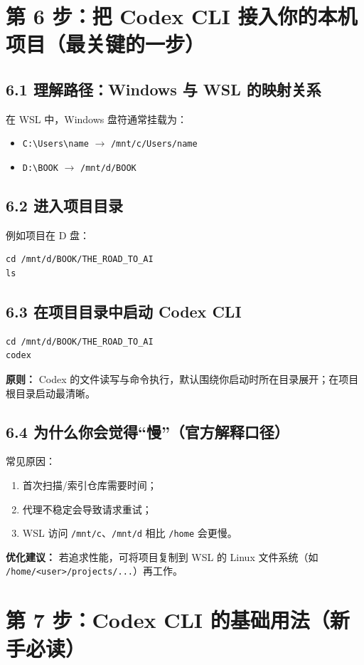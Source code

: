 \documentclass[11pt,a4paper]{article}
\begin{document}
\section{第 6 步：把 Codex CLI 接入你的本机项目（最关键的一步）}
\subsection{6.1 理解路径：Windows 与 WSL 的映射关系}
在 WSL 中，Windows 盘符通常挂载为：
\begin{itemize}[leftmargin=1.5em]
  \item \texttt{C:\textbackslash Users\textbackslash name} $\rightarrow$ \texttt{/mnt/c/Users/name}
  \item \texttt{D:\textbackslash BOOK} $\rightarrow$ \texttt{/mnt/d/BOOK}
\end{itemize}

\subsection{6.2 进入项目目录}
例如项目在 D 盘：
\begin{lstlisting}
cd /mnt/d/BOOK/THE_ROAD_TO_AI
ls
\end{lstlisting}

\subsection{6.3 在项目目录中启动 Codex CLI}
\begin{lstlisting}
cd /mnt/d/BOOK/THE_ROAD_TO_AI
codex
\end{lstlisting}
\textbf{原则：} Codex 的文件读写与命令执行，默认围绕你启动时所在目录展开；在项目根目录启动最清晰。

\subsection{6.4 为什么你会觉得“慢”（官方解释口径）}
常见原因：
\begin{enumerate}[leftmargin=1.7em]
  \item 首次扫描/索引仓库需要时间；
  \item 代理不稳定会导致请求重试；
  \item WSL 访问 \texttt{/mnt/c}、\texttt{/mnt/d} 相比 \texttt{/home} 会更慢。
\end{enumerate}
\textbf{优化建议：} 若追求性能，可将项目复制到 WSL 的 Linux 文件系统（如 \texttt{/home/<user>/projects/...}）再工作。

\section{第 7 步：Codex CLI 的基础用法（新手必读）}
\end{document}
